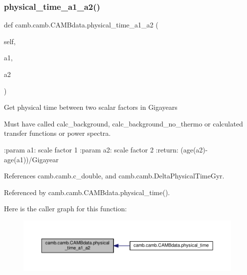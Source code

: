 \subsubsection{\texorpdfstring{physical\+\_\+time\+\_\+a1\+\_\+a2()}{physical\_time\_a1\_a2()}}
{\footnotesize\ttfamily def camb.\+camb.\+C\+A\+M\+Bdata.\+physical\+\_\+time\+\_\+a1\+\_\+a2 (\begin{DoxyParamCaption}\item[{}]{self,  }\item[{}]{a1,  }\item[{}]{a2 }\end{DoxyParamCaption})}

\begin{DoxyVerb}Get physical time between two scalar factors in Gigayears

Must have called calc_background, calc_background_no_thermo or calculated transfer functions or power spectra.

:param a1: scale factor 1
:param a2: scale factor 2
:return: (age(a2)-age(a1))/Gigayear
\end{DoxyVerb}
 

References camb.\+camb.\+c\+\_\+double, and camb.\+camb.\+Delta\+Physical\+Time\+Gyr.



Referenced by camb.\+camb.\+C\+A\+M\+Bdata.\+physical\+\_\+time().

Here is the caller graph for this function\+:
\nopagebreak
\begin{figure}[H]
\begin{center}
\leavevmode
\includegraphics[width=350pt]{classcamb_1_1camb_1_1CAMBdata_a4dd9bc539d831789e3fbad5bb882111e_icgraph}
\end{center}
\end{figure}
\mbox{\label{classcamb_1_1camb_1_1CAMBdata_a9fceb84d376ce937446c78b7e8b9034a}} 
